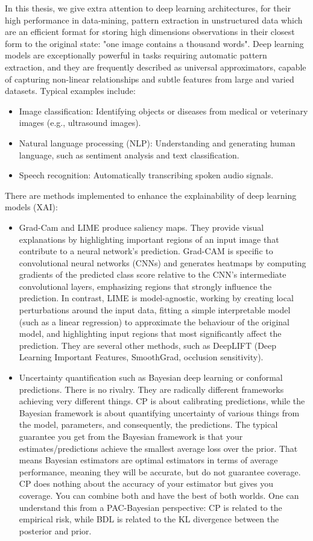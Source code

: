 In this thesis, we give extra attention to deep learning architectures, for their high performance in data-mining, pattern extraction in unstructured data which are an efficient format for storing high dimensions observations in their closest form to the original state: "one image contains a thousand words". 
Deep learning models are exceptionally powerful in tasks requiring automatic pattern extraction, and they are frequently described as universal approximators, capable of capturing non-linear relationships and subtle features from large and varied datasets. Typical examples include:

\begin{itemize}
    \item Image classification: Identifying objects or diseases from medical or veterinary images (e.g., ultrasound images).
    \item Natural language processing (NLP): Understanding and generating human language, such as sentiment analysis and text classification.
    \item Speech recognition: Automatically transcribing spoken audio signals.
\end{itemize}

There are methods implemented to enhance the explainability of deep learning models (XAI):
\begin{itemize}
    \item Grad-Cam and LIME produce saliency maps. They provide visual explanations by highlighting important regions of an input image that contribute to a neural network's prediction. Grad-CAM is specific to convolutional neural networks (CNNs) and generates heatmaps by computing gradients of the predicted class score relative to the CNN's intermediate convolutional layers, emphasizing regions that strongly influence the prediction. In contrast, LIME is model-agnostic, working by creating local perturbations around the input data, fitting a simple interpretable model (such as a linear regression) to approximate the behaviour of the original model, and highlighting input regions that most significantly affect the prediction. They are several other methods, such as DeepLIFT (Deep Learning Important Features, SmoothGrad, occlusion sensitivity). 
    \item Uncertainty quantification such as Bayesian deep learning or conformal predictions. There is no rivalry. They are radically different frameworks achieving very different things. CP is about calibrating predictions, while the Bayesian framework is about quantifying uncertainty of various things from the model, parameters, and consequently, the predictions. The typical guarantee you get from the Bayesian framework is that your estimates/predictions achieve the smallest average loss over the prior. That means Bayesian estimators are optimal estimators in terms of average performance, meaning they will be accurate, but do not guarantee coverage. CP does nothing about the accuracy of your estimator but gives you coverage. You can combine both and have the best of both worlds. One can understand this from a PAC-Bayesian perspective: CP is related to the empirical risk, while BDL is related to the KL divergence between the posterior and prior. 
\end{itemize}

